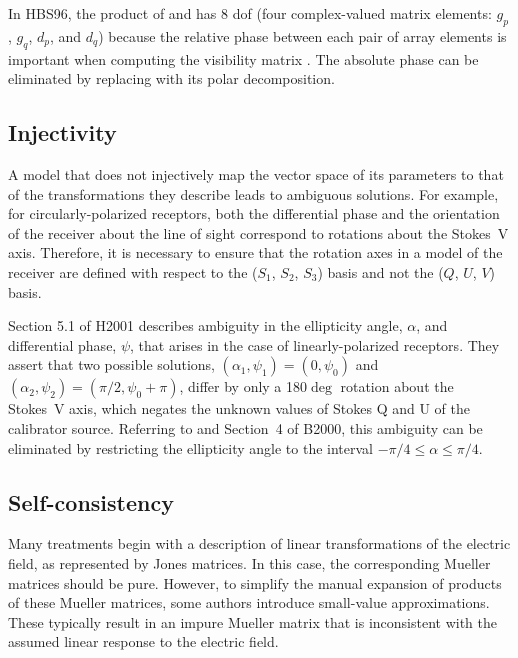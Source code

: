 In HBS96, the product of  and  has 8 dof (four complex-valued matrix elements: $g_p$, $g_q$, $d_p$, and $d_q$) because the relative phase between each pair of array elements is important when computing the visibility matrix .  The absolute phase can be eliminated by replacing  with its polar decomposition.

\subsection{Injectivity}
\label{sec:injectivity}

A model that does not injectively map the vector space of its
parameters to that of the transformations they describe
leads to ambiguous solutions.  
%
For example, for circularly-polarized receptors, both the differential
phase and the orientation of the receiver about the line of sight correspond to rotations about the Stokes~V axis.  Therefore, it is
necessary to ensure that the rotation axes in a model of the receiver
are defined with respect to the ($S_1$, $S_2$, $S_3$) basis and not
the ($Q$, $U$, $V$) basis.

Section 5.1 of H2001 describes ambiguity in the 
ellipticity angle, $\alpha$, and differential phase, $\psi$, that arises in the case of linearly-polarized receptors.
%
They assert that two possible solutions, 
$(\alpha_1, \psi_1) = (0, \psi_0)$ and 
$(\alpha_2, \psi_2) = (\pi/2, \psi_0 + \pi)$,
%
%
differ by only a 180$\deg$ rotation about the Stokes~V axis, which negates the unknown values of Stokes Q and U of the calibrator source.
%
Referring to  and Section~4 of B2000, this ambiguity can be eliminated by restricting the ellipticity angle to the 
interval $-\pi/4 \le \alpha \le \pi/4$.

\subsection{Self-consistency}
\label{sec:self_consistency}

Many treatments begin with a description of linear transformations of
the electric field, as represented by Jones matrices.  In this case,
the corresponding Mueller matrices should be pure.  However, to simplify the
manual expansion of products of these Mueller matrices, some authors
introduce small-value approximations.  These typically result in an 
impure Mueller matrix that is inconsistent with the assumed linear 
response to the electric field.

